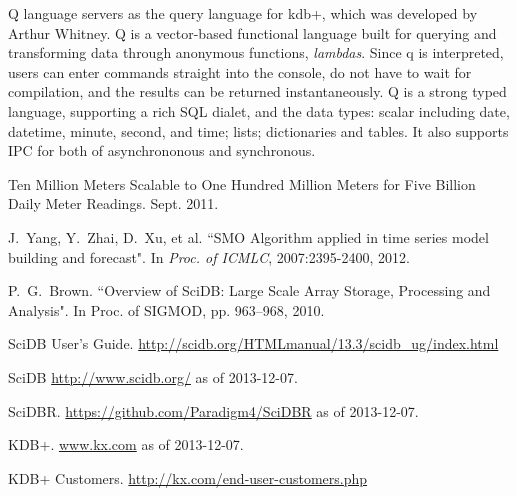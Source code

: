 \documentclass[a4paper,12pt]{llncs}
\begin{document}
Q language servers as the query language for kdb+, which was developed by Arthur Whitney.  Q is a vector-based functional language  built for querying  and transforming data through anonymous functions, {\em lambdas}. Since q is interpreted, users can enter commands straight into the console, do not have to wait for compilation, and the results can be returned instantaneously. Q is a strong typed language, supporting a rich SQL dialet, and the data types: scalar including date, datetime, minute, second, and time; lists; dictionaries and tables. It also supports IPC for both of asynchrononous and synchronous.

 
\medskip
\begin{thebibliography}{1}

Ten Million Meters Scalable to One Hundred Million Meters for Five Billion Daily Meter Readings. Sept. 2011.

J.~Yang, Y.~Zhai, D.~Xu, et al. ``SMO Algorithm applied in
time series model building and forecast". In {\em Proc. of ICMLC}, 2007:2395-2400, 2012.

P.~G.~Brown.  ``Overview of SciDB: Large Scale Array Storage, Processing and Analysis". In Proc. of SIGMOD, pp. 963--968, 2010.

SciDB User's Guide. \url{http://scidb.org/HTMLmanual/13.3/scidb_ug/index.html}

SciDB \url{http://www.scidb.org/} as of 2013-12-07.

SciDBR. \url{https://github.com/Paradigm4/SciDBR} as of 2013-12-07.

KDB+.  \url{www.kx.com} as of 2013-12-07.

KDB+ Customers. \url{http://kx.com/end-user-customers.php}
\end{thebibliography}
\end{document}

